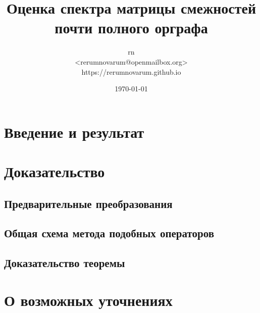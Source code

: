 \documentclass[a4paper]{article}
\title{Оценка спектра матрицы смежностей почти полного орграфа}
\date{\today}
\author{
    rn\\
    <rerumnovarum@openmailbox.org>\\
    https://rerumnovarum.github.io}
\begin{document}
\maketitle

\tableofcontents
\newpage

%
\section{Введение и результат}

\section{Доказательство}
\subsection{Предварительные преобразования}


\clearpage
\subsection{Общая схема метода подобных операторов}

\subsection{Доказательство теоремы}

\section{О возможных уточнениях}




\end{document}
